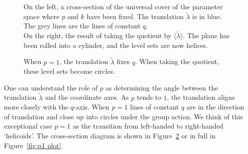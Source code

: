 \documentclass{article}
\begin{document}
\begin{figure}
{\begin{tikzpicture}
\end{tikzpicture}
}
    \caption{On the left, a cross-section of the universal cover of the parameter space where $p$ and $k$ have been fixed. The translation $\tilde{\lambda}$ is in blue. The grey lines are the lines of constant $q$.\\
    On the right, the result of taking the quotient by $\langle \tilde{\lambda}\rangle$. The plane has been rolled into a cylinder, and the level sets are now helices.\label{fig:level set quotient}}
\end{figure}
\begin{figure}
    
    \caption{When $p=1$, the translation $\tilde{\lambda}$ fixes $q$. When taking the quotient, these level sets become circles.\label{fig:level set quotient p1}}
\end{figure}

One can understand the role of $p$ as determining the angle between the translation $\tilde{\lambda}$ and the coordinate axes. As $p$ tends to $1$, the translation aligns more closely with the $q$-axis. When $p=1$ lines of constant $q$ are in the direction of translation and close up into circles under the group action. We think of this exceptional case $p=1$ as the transition from left-handed to right-handed `helicoids'. The cross-section diagram is shown in Figure~\ref{fig:level set quotient p1} or in full in Figure~\ref{fig:p1 plot}.
\end{document}
